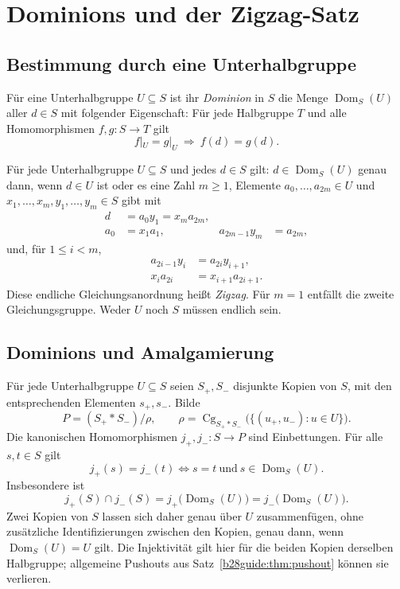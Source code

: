 \chapter{Dominions und der Zigzag-Satz}

\section{Bestimmung durch eine Unterhalbgruppe}

\begin{definition}[Dominion]
Für eine Unterhalbgruppe $U\subseteq S$ ist ihr \emph{Dominion} in $S$
die Menge $\operatorname{Dom}_S(U)$ aller $d\in S$ mit folgender
Eigenschaft: Für jede Halbgruppe $T$ und alle Homomorphismen
$f,g:S\to T$ gilt
\[
 f|_U=g|_U\ \Longrightarrow\ f(d)=g(d).
\]
\end{definition}

\begin{theorem}
\label{b28guide:thm:zigzag}
Für jede Unterhalbgruppe $U\subseteq S$ und jedes $d\in S$ gilt:
$d\in\operatorname{Dom}_S(U)$ genau dann, wenn $d\in U$ ist oder
es eine Zahl $m\geq1$, Elemente $a_0,\ldots,a_{2m}\in U$
und $x_1,\ldots,x_m,y_1,\ldots,y_m\in S$ gibt mit
\[
 \begin{aligned}
 d&=a_0y_1=x_ma_{2m},\\
 a_0&=x_1a_1,& a_{2m-1}y_m&=a_{2m},
 \end{aligned}
\]
und, für $1\leq i<m$,
\[
 \begin{aligned}
 a_{2i-1}y_i&=a_{2i}y_{i+1},\\
 x_i a_{2i}&=x_{i+1}a_{2i+1}.
 \end{aligned}
\]
Diese endliche Gleichungsanordnung heißt \emph{Zigzag}.
Für $m=1$ entfällt die zweite Gleichungsgruppe.
Weder $U$ noch $S$ müssen endlich sein.
\cite{isbell1966,alam2019}
\end{theorem}

\section{Dominions und Amalgamierung}

\begin{theorem}
\label{b28guide:thm:dominion-amalgam}
Für jede Unterhalbgruppe $U\subseteq S$ seien $S_+,S_-$ disjunkte
Kopien von $S$, mit den entsprechenden Elementen $s_+,s_-$.
Bilde
\[
 P=(S_+*S_-)/\rho,\qquad
 \rho=\operatorname{Cg}_{S_+*S_-}
 \bigl(\{(u_+,u_-):u\in U\}\bigr).
\]
Die kanonischen Homomorphismen $j_+,j_-:S\to P$ sind Einbettungen.
Für alle $s,t\in S$ gilt
\[
 j_+(s)=j_-(t)
 \iff s=t\ \text{und}\ s\in\operatorname{Dom}_S(U).
\]
Insbesondere ist
\[
 j_+(S)\cap j_-(S)
 =j_+\bigl(\operatorname{Dom}_S(U)\bigr)
 =j_-\bigl(\operatorname{Dom}_S(U)\bigr).
\]
Zwei Kopien von $S$ lassen sich daher genau über $U$ zusammenfügen,
ohne zusätzliche Identifizierungen zwischen den Kopien,
genau dann, wenn $\operatorname{Dom}_S(U)=U$ gilt.
Die Injektivität gilt hier für die beiden Kopien derselben Halbgruppe;
allgemeine Pushouts aus Satz~\ref{b28guide:thm:pushout} können sie verlieren.
\cite{isbell1966,howie1968}
\end{theorem}


